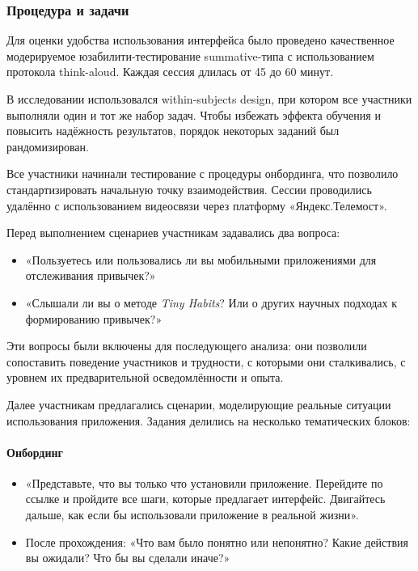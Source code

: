 \documentclass[pdflatex,sn-mathphys-num]{sn-jnl}%
\theoremstyle{thmstyleone}%
\theoremstyle{thmstyletwo}%
\theoremstyle{thmstylethree}%
\begin{document}
\subsubsection{Процедура и задачи}

Для оценки удобства использования интерфейса было проведено качественное модерируемое юзабилити-тестирование summative-типа с использованием протокола think-aloud. Каждая сессия длилась от 45 до 60 минут.

В исследовании использовался within-subjects design, при котором все участники выполняли один и тот же набор задач. Чтобы избежать эффекта обучения и повысить надёжность результатов, порядок некоторых заданий был рандомизирован.

Все участники начинали тестирование с процедуры онбординга, что позволило стандартизировать начальную точку взаимодействия. Сессии проводились удалённо с использованием видеосвязи через платформу «Яндекс.Телемост».

Перед выполнением сценариев участникам задавались два вопроса:

\begin{itemize}
\item «Пользуетесь или пользовались ли вы мобильными приложениями для отслеживания привычек?»
\item «Слышали ли вы о методе \textit{Tiny Habits}? Или о других научных подходах к формированию привычек?»
\end{itemize}

Эти вопросы были включены для последующего анализа: они позволили сопоставить поведение участников и трудности, с которыми они сталкивались, с уровнем их предварительной осведомлённости и опыта.

Далее участникам предлагались сценарии, моделирующие реальные ситуации использования приложения. Задания делились на несколько тематических блоков:

\paragraph{Онбординг}
\begin{itemize}
\item «Представьте, что вы только что установили приложение. Перейдите по ссылке и пройдите все шаги, которые предлагает интерфейс. Двигайтесь дальше, как если бы использовали приложение в реальной жизни».
\item После прохождения: «Что вам было понятно или непонятно? Какие действия вы ожидали? Что бы вы сделали иначе?»
\end{itemize}
\end{document}
